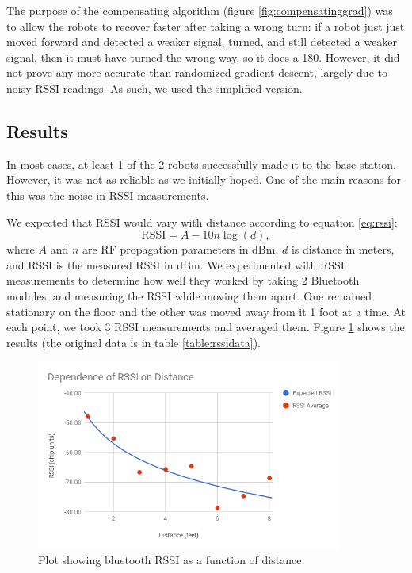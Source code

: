 \documentclass[]{article}
\begin{document}
The purpose of the compensating algorithm (figure \ref{fig:compensatinggrad}) was to allow the robots to recover faster after taking a wrong turn: if a robot just just moved forward and detected a weaker signal, turned, and still detected a weaker signal, then it must have turned the wrong way, so it does a 180.
However, it did not prove any more accurate than randomized gradient descent, largely due to noisy RSSI readings.
As such, we used the simplified version.

\subsection{Results}

In most cases, at least 1 of the 2 robots successfully made it to the
base station. However, it was not as reliable as we initially hoped. One
of the main reasons for this was the noise in RSSI measurements.

We expected that RSSI would vary with distance according to equation \ref{eq:rssi}:
\begin{equation} \label{eq:rssi}
  \text{RSSI} = A - 10 n \log(d),
\end{equation}
where $A$ and $n$ are RF propagation parameters in dBm, $d$ is distance in meters, and RSSI is the measured RSSI in dBm. \cite{5415423}
We experimented with RSSI measurements to determine how well they worked by taking 2 Bluetooth modules, and measuring the RSSI while moving them apart.
One remained stationary on the floor and the other was moved away from it 1 foot at a time.
At each point, we took 3 RSSI measurements and averaged them. Figure \ref{fig:rssiplot} shows the results (the original data is in table \ref{table:rssidata}).

\begin{figure}
  \centering
  \includegraphics[width=0.9\textwidth]{rssi-chart.png}
  \caption{Plot showing bluetooth RSSI as a function of distance}
  \label{fig:rssiplot}
\end{figure}
\end{document}
